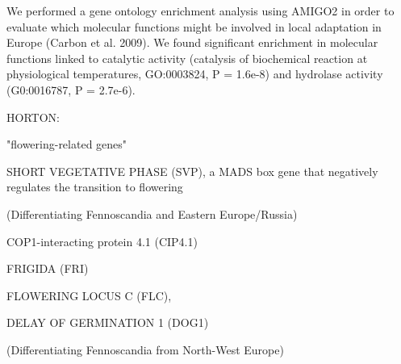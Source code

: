  We performed a gene ontology enrichment analysis using AMIGO2 in order to evaluate which molecular functions might be involved in local adaptation in Europe (Carbon et al. 2009). We found significant enrichment in molecular functions linked to catalytic activity (catalysis of biochemical reaction at physiological temperatures, GO:0003824, P = 1.6e-8) and hydrolase activity (G0:0016787, P = 2.7e-6).



HORTON:

"flowering-related genes" 

SHORT VEGETATIVE PHASE (SVP), a MADS box gene that negatively regulates the transition to flowering

(Differentiating Fennoscandia and Eastern Europe/Russia)

COP1-interacting protein 4.1 (CIP4.1)

FRIGIDA (FRI)

FLOWERING LOCUS C (FLC),

DELAY OF GERMINATION 1 (DOG1)

(Differentiating Fennoscandia from North-West Europe)



